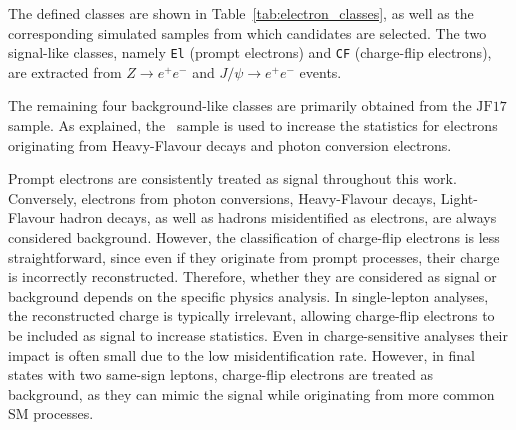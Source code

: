 The defined classes are shown in Table~\ref{tab:electron_classes}, as well as the corresponding simulated samples from which candidates are selected. The two signal-like classes, namely \texttt{El} (prompt electrons) and \texttt{CF} (charge-flip electrons), are extracted from $Z \rightarrow e^{+}e^{-}$ and $J/\psi \rightarrow e^{+}e^{-}$ events.

The remaining four background-like classes are primarily obtained from the $\text{JF}17$ sample. As explained, the \ttbar\ sample is used to increase the statistics for electrons originating from Heavy-Flavour decays and photon conversion electrons.

Prompt electrons are consistently treated as signal throughout this work. Conversely, electrons from photon conversions, Heavy-Flavour decays, Light-Flavour hadron decays, as well as hadrons misidentified as electrons, are always considered background. However, the classification of charge-flip electrons is less straightforward, since even if they originate from prompt processes, their charge is incorrectly reconstructed. Therefore, whether they are considered as signal or background depends on the specific physics analysis.
In single-lepton analyses, the reconstructed charge is typically irrelevant, allowing charge-flip electrons to be included as signal to increase statistics. Even in charge-sensitive analyses their impact is often small due to the low misidentification rate. However, in final states with two same-sign leptons, charge-flip electrons are treated as background, as they can mimic the signal while originating from more common SM processes.

